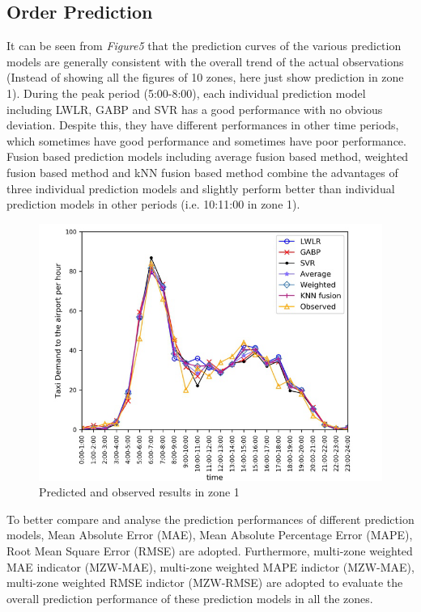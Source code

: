 \documentclass[sigconf]{acmart}
\begin{document}
\subsection{Order Prediction}
It can be seen from \textit{Figure5} that the prediction curves
of the various prediction models are generally consistent
with the overall trend of the actual observations
(Instead of showing all the figures of 10 zones, here just show prediction in zone 1).
During the peak period (5:00-8:00), each individual
prediction model including LWLR, GABP and SVR has
a good performance with no obvious deviation. Despite
this, they have different performances in other time
periods, which sometimes have good performance and sometimes
have poor performance. Fusion based prediction models
including average fusion based method, weighted fusion
based method and kNN fusion based method combine the
advantages of three individual prediction models and
slightly perform better than individual prediction models
in other periods (i.e. 10:11:00 in zone 1). 
\begin{figure}[h]
  \centering
  \includegraphics[width=1\linewidth]{zone1}
  \caption{Predicted and observed results in zone 1}
\end{figure}
To better compare and analyse the prediction performances of different prediction models, Mean Absolute Error (MAE), Mean Absolute Percentage Error (MAPE), Root Mean Square Error (RMSE) are adopted. Furthermore, multi-zone weighted MAE indicator (MZW-MAE), multi-zone weighted MAPE indictor (MZW-MAE), multi-zone weighted RMSE indictor (MZW-RMSE) are adopted to evaluate the overall prediction performance of these prediction models in all the zones.
\end{document}
